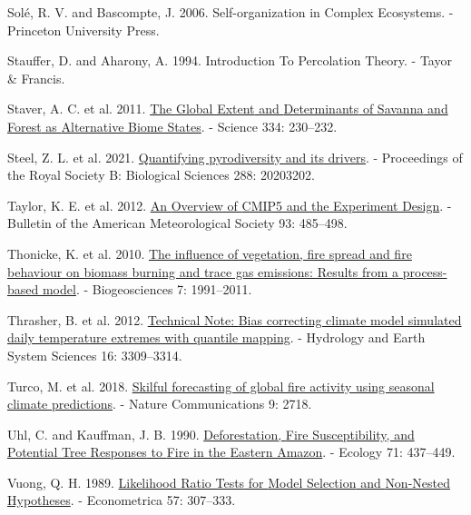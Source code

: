 \documentclass[
]{article}
\newlength{\cslhangindent}
\newenvironment{CSLReferences}[2] %
 {\begin{list}{}{%
  \setlength{\itemindent}{0pt}
  \setlength{\leftmargin}{0pt}
  \setlength{\parsep}{0pt}
  \ifodd #1
   \setlength{\leftmargin}{\cslhangindent}
   \setlength{\itemindent}{-1\cslhangindent}
  \fi
  \setlength{\itemsep}{#2\baselineskip}}}
 {\end{list}}
\begin{document}
\begin{CSLReferences}{1}{1}
Solé, R. V. and Bascompte, J. 2006. Self-organization in {Complex
Ecosystems}. - {Princeton University Press}.

Stauffer, D. and Aharony, A. 1994. Introduction {To Percolation Theory}.
- {Tayor \& Francis}.

Staver, A. C. et al. 2011.
\href{https://doi.org/10.1126/science.1210465}{The {Global Extent} and
{Determinants} of {Savanna} and {Forest} as {Alternative Biome States}}.
- Science 334: 230--232.

Steel, Z. L. et al. 2021.
\href{https://doi.org/10.1098/rspb.2020.3202}{Quantifying pyrodiversity
and its drivers}. - Proceedings of the Royal Society B: Biological
Sciences 288: 20203202.

Taylor, K. E. et al. 2012.
\href{https://doi.org/10.1175/BAMS-D-11-00094.1}{An {Overview} of
{CMIP5} and the {Experiment Design}}. - Bulletin of the American
Meteorological Society 93: 485--498.

Thonicke, K. et al. 2010.
\href{https://doi.org/10.5194/bg-7-1991-2010}{The influence of
vegetation, fire spread and fire behaviour on biomass burning and trace
gas emissions: Results from a process-based model}. - Biogeosciences 7:
1991--2011.

Thrasher, B. et al. 2012.
\href{https://doi.org/10.5194/hess-16-3309-2012}{Technical {Note}:
{Bias} correcting climate model simulated daily temperature extremes
with quantile mapping}. - Hydrology and Earth System Sciences 16:
3309--3314.

Turco, M. et al. 2018.
\href{https://doi.org/10.1038/s41467-018-05250-0}{Skilful forecasting of
global fire activity using seasonal climate predictions}. - Nature
Communications 9: 2718.

Uhl, C. and Kauffman, J. B. 1990.
\href{https://doi.org/10.2307/1940299}{Deforestation, {Fire
Susceptibility}, and {Potential Tree Responses} to {Fire} in the
{Eastern Amazon}}. - Ecology 71: 437--449.

Vuong, Q. H. 1989. \href{https://doi.org/10.2307/1912557}{Likelihood
{Ratio Tests} for {Model Selection} and {Non-Nested Hypotheses}}. -
Econometrica 57: 307--333.


\end{CSLReferences}
\end{document}
